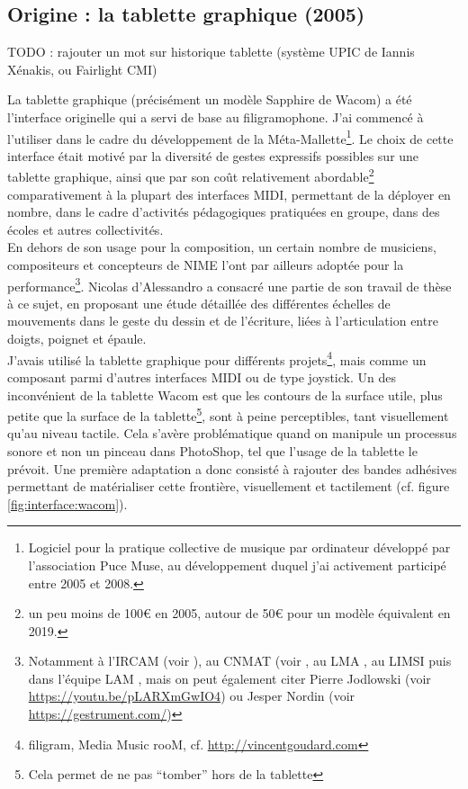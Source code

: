 \subsection{Origine : la tablette graphique (2005)}
\label{sec:interfaces:phylogenese:wacom}

TODO : rajouter un mot sur historique tablette (système UPIC de Iannis Xénakis, ou Fairlight CMI)

\noindent La tablette graphique (précisément un modèle Sapphire de Wacom) a été l’interface originelle qui a servi de base au filigramophone. J’ai commencé à l’utiliser dans le cadre du développement de la Méta-Mallette\footnote{Logiciel pour la pratique collective de musique par ordinateur développé par l’association Puce Muse, au développement duquel j'ai activement participé entre 2005 et 2008.}. Le choix de cette interface était motivé par la diversité de gestes expressifs possibles sur une tablette graphique, ainsi que par son coût relativement abordable\footnote{un peu moins de 100€ en 2005, autour de 50€ pour un modèle équivalent en 2019.} comparativement à la plupart des interfaces \gls{MIDI}, permettant de la déployer en nombre, dans le cadre d'activités pédagogiques pratiquées en groupe, dans des écoles et autres collectivités.\\
\indent En dehors de son usage pour la composition, un certain nombre de musiciens, compositeurs et concepteurs de \gls{NIME} l’ont par ailleurs adoptée pour la performance\footnote{Notamment à l'\gls{IRCAM} (voir \cite{wanderley_choice_2000}), au \gls{CNMAT} (voir \cite{zbyszynski_ten_2007}, au \gls{LMA} \cite{couturier_utilisation_2004}, au \gls{LIMSI} \cite{feugere_chorus_2011} puis dans l'équipe \gls{LAM} \cite{xiao_t-voks_2019}, mais on peut également citer Pierre Jodlowski (voir \url{https://youtu.be/pLARXmGwIO4}) ou Jesper Nordin (voir \url{https://gestrument.com/})}. Nicolas d’Alessandro a consacré une partie de son travail de thèse \cite{dalessandro_realtime_2009} à ce sujet, en proposant une étude détaillée des différentes échelles de mouvements dans le geste du dessin et de l'écriture, liées à l'articulation entre doigts, poignet et épaule.\\
\indent J'avais utilisé la tablette graphique pour différents projets\footnote{filigram, Media Music rooM, cf. \url{http://vincentgoudard.com}}, mais comme un composant parmi d'autres interfaces \gls{MIDI} ou de type joystick.
\indent Un des inconvénient de la tablette Wacom est que les contours de la surface utile, plus petite que la surface de la tablette\footnote{Cela permet de ne pas ``tomber'' hors de la tablette}, sont à peine perceptibles, tant visuellement qu'au niveau tactile. Cela s'avère problématique quand on manipule un processus sonore et non un pinceau dans PhotoShop, tel que l'usage de la tablette le prévoit. Une première adaptation a donc consisté à rajouter des bandes adhésives permettant de matérialiser cette frontière, visuellement et tactilement (cf. figure \ref{fig:interface:wacom}).\\
